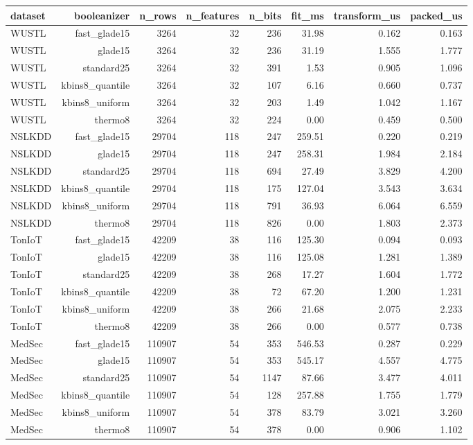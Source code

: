 \begin{tabular}{lrrrrrrr}
\toprule
dataset & booleanizer & n\_rows & n\_features & n\_bits & fit\_ms & transform\_us & packed\_us \\
\midrule
WUSTL & fast\_glade15 & 3264 & 32 & 236 & 31.98 & 0.162 & 0.163 \\
WUSTL & glade15 & 3264 & 32 & 236 & 31.19 & 1.555 & 1.777 \\
WUSTL & standard25 & 3264 & 32 & 391 & 1.53 & 0.905 & 1.096 \\
WUSTL & kbins8\_quantile & 3264 & 32 & 107 & 6.16 & 0.660 & 0.737 \\
WUSTL & kbins8\_uniform & 3264 & 32 & 203 & 1.49 & 1.042 & 1.167 \\
WUSTL & thermo8 & 3264 & 32 & 224 & 0.00 & 0.459 & 0.500 \\
NSLKDD & fast\_glade15 & 29704 & 118 & 247 & 259.51 & 0.220 & 0.219 \\
NSLKDD & glade15 & 29704 & 118 & 247 & 258.31 & 1.984 & 2.184 \\
NSLKDD & standard25 & 29704 & 118 & 694 & 27.49 & 3.829 & 4.200 \\
NSLKDD & kbins8\_quantile & 29704 & 118 & 175 & 127.04 & 3.543 & 3.634 \\
NSLKDD & kbins8\_uniform & 29704 & 118 & 791 & 36.93 & 6.064 & 6.559 \\
NSLKDD & thermo8 & 29704 & 118 & 826 & 0.00 & 1.803 & 2.373 \\
TonIoT & fast\_glade15 & 42209 & 38 & 116 & 125.30 & 0.094 & 0.093 \\
TonIoT & glade15 & 42209 & 38 & 116 & 125.08 & 1.281 & 1.389 \\
TonIoT & standard25 & 42209 & 38 & 268 & 17.27 & 1.604 & 1.772 \\
TonIoT & kbins8\_quantile & 42209 & 38 & 72 & 67.20 & 1.200 & 1.231 \\
TonIoT & kbins8\_uniform & 42209 & 38 & 266 & 21.68 & 2.075 & 2.233 \\
TonIoT & thermo8 & 42209 & 38 & 266 & 0.00 & 0.577 & 0.738 \\
MedSec & fast\_glade15 & 110907 & 54 & 353 & 546.53 & 0.287 & 0.229 \\
MedSec & glade15 & 110907 & 54 & 353 & 545.17 & 4.557 & 4.775 \\
MedSec & standard25 & 110907 & 54 & 1147 & 87.66 & 3.477 & 4.011 \\
MedSec & kbins8\_quantile & 110907 & 54 & 128 & 257.88 & 1.755 & 1.779 \\
MedSec & kbins8\_uniform & 110907 & 54 & 378 & 83.79 & 3.021 & 3.260 \\
MedSec & thermo8 & 110907 & 54 & 378 & 0.00 & 0.906 & 1.102 \\
\bottomrule
\end{tabular}

